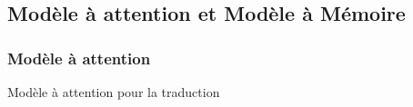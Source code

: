 \subsection{Modèle à attention et Modèle à Mémoire}



\begin{frame}
  \frametitle{Modèle à attention}
  Modèle à attention pour la traduction
  \begin{center}
  \end{center}
\end{frame}

